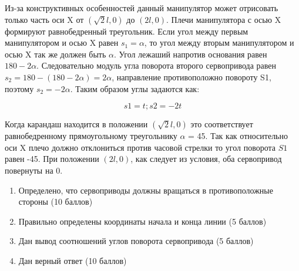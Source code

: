 \solutionSection
Из-за конструктивных особенностей данный манипулятор может отрисовать только часть оси X от $(\sqrt{2}l, 0)$ до $(2l, 0)$. Плечи манипулятора с осью X формируют равнобедренный треугольник. Если угол между первым манипулятором и осью X равен $s_1=\alpha$, то угол между вторым манипулятором и осью X так же должен быть $\alpha$. Угол лежаший напротив основания равен $180 - 2\alpha$. Следовательно модуль угла поворота второго сервопривода равен $s_2 = 180 - (180 - 2\alpha) = 2\alpha$, направление противоположно повороту S1, поэтому $s_2 = -2\alpha$. Таким образом углы задаются как:

\[ s1 = t; s2 = -2t\]

Когда карандаш находится в положении $(\sqrt{2}l, 0)$ это соответствует равнобедренному прямоугольному треугольнику $\alpha$ = 45\textdegree. Так как относительно оси X плечо должно отклониться против часовой стрелки то угол поворота $S1$ равен -45\textdegree. При положении $(2l, 0)$, как следует из условия, оба сервопривод повернуты на 0\textdegree. 


\markSection

\begin{enumerate}
    \item Определено, что сервоприводы должны вращаться в противоположные стороны (10 баллов) 
    \item Правильно определены координаты начала и конца линии (5 баллов) 
    \item Дан вывод соотношений углов поворота сервопривода (5 баллов)
    \item Дан верный ответ (10 баллов)
\end{enumerate}